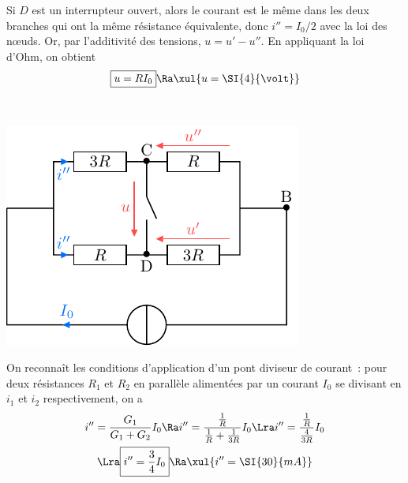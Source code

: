 \documentclass[a4paper, 10pt, garamond, oneside]{book}
\begin{document}
{\begin{enumerate}
\begin{minipage}[t]{0.55\linewidth}
			Si $D$ est un interrupteur ouvert, alors le courant est le même
			dans les deux branches qui ont la même résistance équivalente,
			donc $i''=I_0/2$ avec la loi des nœuds.
			\smallbreak
			Or, par l'additivité des tensions, $u=u'-u''$. En appliquant la loi
			d'Ohm, on obtient
			\[
				\boxed{u = RI_0}
				\Ra
				\xul{u = \SI{4}{\volt}}
			\]
		\end{minipage}
		\hfill
		\begin{minipage}[t]{0.4\linewidth}
			~
			\vspace{-40pt}
			\begin{center}
				\includegraphics[width=\linewidth]{diplin_q6}
			\end{center}
		\end{minipage}
		 \noindent
		\begin{minipage}[t]{0.55\linewidth}
			On reconnaît les conditions d'application d'un pont diviseur de
			courant~: pour deux résistances $R_1$ et $R_2$ en parallèle
			alimentées par un courant $I_0$ se divisant en $i_1$ et $i_2$
			respectivement, on a
			\begin{gather*}
				i'' = \frac{G_1}{G_1+G_2}I_0
				\Ra
				i'' = \frac{\frac{1}{R}}{\frac{1}{R}+\frac{1}{3R}}I_0
				\Lra
				i'' = \frac{\frac{1}{R}}{\frac{4}{3R}}I_0
				\\\Lra
				\boxed{i'' = \frac{3}{4}I_0}
				\Ra
				\xul{i'' = \SI{30}{mA}}
			\end{gather*}
		\end{minipage}
		\hfill
		\begin{minipage}[t]{0.4\linewidth}
			~
			\vspace{-20pt}

\end{minipage}
\end{enumerate}}
\end{document}
